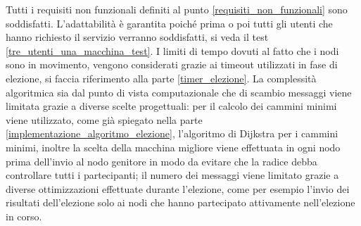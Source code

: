 Tutti i requisiti non funzionali definiti al punto \ref{requisiti_non_funzionali} sono soddisfatti. L'adattabilità è garantita poiché prima o poi tutti gli utenti che hanno richiesto il servizio verranno soddisfatti, si veda il test \ref{tre_utenti_una_macchina_test}. I limiti di tempo dovuti al fatto che i nodi sono in movimento, vengono considerati grazie ai timeout utilizzati in fase di elezione, si faccia riferimento alla parte \ref{timer_elezione}. La complessità algoritmica sia dal punto di vista computazionale che di scambio messaggi viene limitata grazie a diverse scelte progettuali: per il calcolo dei cammini minimi viene utilizzato, come già spiegato nella parte \ref{implementazione_algoritmo_elezione}, l'algoritmo di Dijkstra per i cammini minimi, inoltre la scelta della macchina migliore viene effettuata in ogni nodo prima dell'invio al nodo genitore in modo da evitare che la radice debba controllare tutti i partecipanti; il numero dei messaggi viene limitato grazie a diverse ottimizzazioni effettuate durante l'elezione, come per esempio l'invio dei risultati dell'elezione solo ai nodi che hanno partecipato attivamente nell'elezione in corso. 

